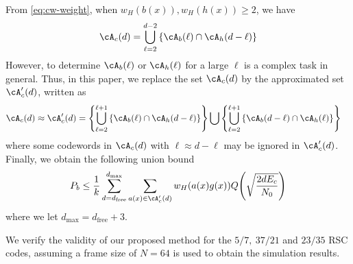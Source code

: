 From \eqref{eq:cw-weight}, when $w_H(b(x)), w_H(h(x)) \geq 2$, we have
\begin{align}
\cA_c(d) = \bigcup_{\ell = 2}^{d-2} \left\{\cA_b(\ell) \cap \cA_h(d-\ell)\right\}
\label{Eq:exactset}
\end{align}
However, to determine $\cA_b(\ell)$ or $\cA_h(\ell)$ for a large $\ell$ is a complex task in general. Thus, in this paper, we replace the set $\cA_c(d)$ by the approximated set $\cA_c'(d)$, written as %
\begin{equation}
\begin{split}
\cA_c(d) \approx \cA_c'(d) &= \left\{\bigcup_{\ell = 2}^{\ell+1} \left\{\cA_b(\ell) \cap \cA_h(d-\ell)\right\}\right\}\bigcup \left\{\bigcup_{\ell = 2}^{\ell+1} \left\{\cA_b(d-\ell) \cap \cA_h(\ell)\right\}\right\}
\end{split}
\label{setApprox}
\end{equation}
where some codewords in $\cA_c(d)$ with $\ell \approx d-\ell$ may be ignored in $\cA_c'(d)$.
Finally, we obtain the following union bound
\begin{align}
P_b \leq \frac{1}{k} \sum_{d=d_{\text{free}}}^{d_{\text{max}}} \sum_{a(x) \in \cA'_c(d)}w_H(a(x)g(x)) Q\Bigg( \sqrt{\frac{2dE_c}{N_0}}\Bigg)
\label{novelEq7}
\end{align}
where we let $d_{\text{max}}=d_{\text{free}}+3$. 


We verify the validity of our proposed method for the $5/7,~37/21$ and $23/35$ RSC codes, assuming a frame size of $N=64$ is used to obtain the simulation results.


